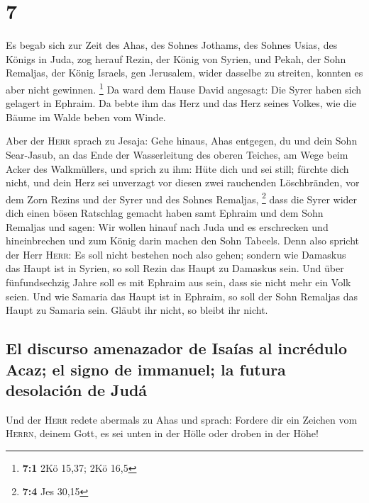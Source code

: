 \hypertarget{section-6}{%
\section{7}\label{section-6}}

 Es begab sich zur Zeit des Ahas, des Sohnes Jothams, des
Sohnes Usias, des Königs in Juda, zog herauf Rezin, der König von
Syrien, und Pekah, der Sohn Remaljas, der König Israels, gen Jerusalem,
wider dasselbe zu streiten, konnten es aber nicht gewinnen. \footnote{\textbf{7:1}
  2Kö 15,37; 2Kö 16,5}  Da ward dem Hause David angesagt:
Die Syrer haben sich gelagert in Ephraim. Da bebte ihm das Herz und das
Herz seines Volkes, wie die Bäume im Walde beben vom Winde.

 Aber der \textsc{Herr} sprach zu Jesaja: Gehe hinaus,
Ahas entgegen, du und dein Sohn Sear-Jasub, an das Ende der
Wasserleitung des oberen Teiches, am Wege beim Acker des Walkmüllers,
 und sprich zu ihm: Hüte dich und sei still; fürchte dich
nicht, und dein Herz sei unverzagt vor diesen zwei rauchenden
Löschbränden, vor dem Zorn Rezins und der Syrer und des Sohnes Remaljas,
\footnote{\textbf{7:4} Jes 30,15}  dass die Syrer wider
dich einen bösen Ratschlag gemacht haben samt Ephraim und dem Sohn
Remaljas und sagen:  Wir wollen hinauf nach Juda und es
erschrecken und hineinbrechen und zum König darin machen den Sohn
Tabeels.  Denn also spricht der Herr \textsc{Herr}: Es
soll nicht bestehen noch also gehen;  sondern wie Damaskus
das Haupt ist in Syrien, so soll Rezin das Haupt zu Damaskus sein. Und
über fünfundsechzig Jahre soll es mit Ephraim aus sein, dass sie nicht
mehr ein Volk seien.  Und wie Samaria das Haupt ist in
Ephraim, so soll der Sohn Remaljas das Haupt zu Samaria sein. Gläubt ihr
nicht, so bleibt ihr nicht.

\hypertarget{el-discurso-amenazador-de-isauxedas-al-incruxe9dulo-acaz-el-signo-de-immanuel-la-futura-desolaciuxf3n-de-juduxe1}{%
\subsection{El discurso amenazador de Isaías al incrédulo Acaz; el signo
de immanuel; la futura desolación de
Judá}\label{el-discurso-amenazador-de-isauxedas-al-incruxe9dulo-acaz-el-signo-de-immanuel-la-futura-desolaciuxf3n-de-juduxe1}}

 Und der \textsc{Herr} redete abermals zu Ahas und
sprach:  Fordere dir ein Zeichen vom \textsc{Herrn},
deinem Gott, es sei unten in der Hölle oder droben in der Höhe!

